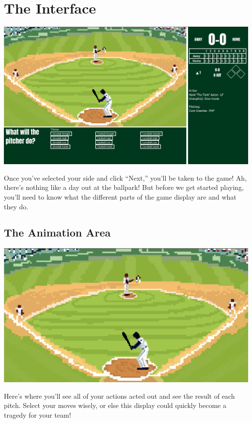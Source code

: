 \documentclass[12pt,a4paper]{report}
\begin{document}
\section{The Interface}
\begin{center}
	\includegraphics[width=1\linewidth]{umInclude/interface}
\end{center}
Once you've selected your side and click ``Next,'' you'll be taken to the game! Ah, there's nothing like a day out at the ballpark! But before we get started playing, you'll need to know what the different parts of the game display are and what they do.

\subsection{The Animation Area}
\begin{center}
	\includegraphics[width=1\linewidth]{umInclude/animation}
\end{center}
Here's where you'll see all of your actions acted out and see the result of each pitch. Select your moves wisely, or else this display could quickly become a tragedy for your team!
\end{document}
